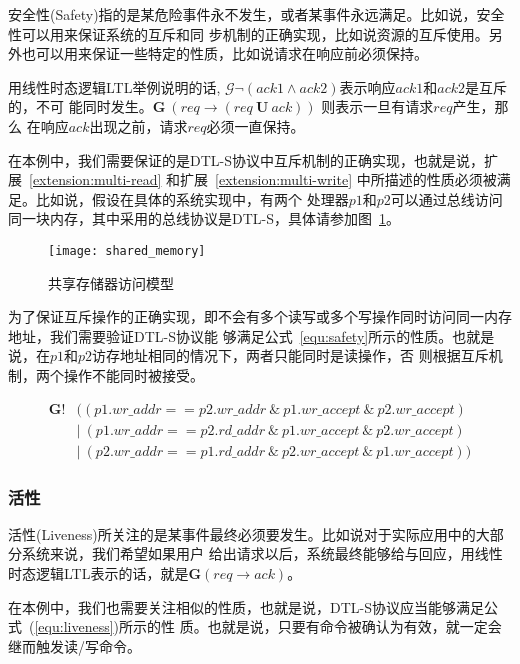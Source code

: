 安全性(Safety)指的是某危险事件永不发生，或者某事件永远满足。比如说，安全性可以用来保证系统的互斥和同
步机制的正确实现，比如说资源的互斥使用。另外也可以用来保证一些特定的性质，比如说请求在响应前必须保持。

用线性时态逻辑LTL举例说明的话, $\mathcal{G} \neg(ack1 \wedge ack2)$表示响应$ack1$和$ack2$是互斥的，不可
能同时发生。$\mathbf{G}\ (req \rightarrow ( req\ \mathbf{U}\ ack))$ 则表示一旦有请求$req$产生，那么
在响应$ack$出现之前，请求$req$必须一直保持。

在本例中，我们需要保证的是DTL-S协议中互斥机制的正确实现，也就是说，扩展~\ref{extension:multi-read}
和扩展~\ref{extension:multi-write} 中所描述的性质必须被满足。比如说，假设在具体的系统实现中，有两个
处理器$p1$和$p2$可以通过总线访问同一块内存，其中采用的总线协议是DTL-S，具体请参加图~\ref{fig:shared_memory}。

\begin{figure}[hl]
\centering
\texttt{[image: shared\_memory]}
\caption{共享存储器访问模型}
\label{fig:shared_memory}
\end{figure} 

为了保证互斥操作的正确实现，即不会有多个读写或多个写操作同时访问同一内存地址，我们需要验证DTL-S协议能
够满足公式~\eqref{equ:safety}所示的性质。也就是说，在$p1$和$p2$访存地址相同的情况下，两者只能同时是读操作，否
则根据互斥机制，两个操作不能同时被接受。

\begin{equation} \label{equ:safety}
\begin{split}
\mathbf{G}!&((p1.wr\_addr == p2.wr\_addr\ \&\ p1.wr\_accept\ \&\ p2.wr\_accept)\\
&|\ (p1.wr\_addr == p2.rd\_addr\ \& \ p1.wr\_accept\ \&\ p2.wr\_accept)\\
&|\ (p2.wr\_addr == p1.rd\_addr\ \& \ p2.wr\_accept\ \&\ p1.wr\_accept))
\end{split}
\end{equation}

\subsubsection{活性}
\label{sec:liveness}

活性(Liveness)所关注的是某事件最终必须要发生。比如说对于实际应用中的大部分系统来说，我们希望如果用户
给出请求以后，系统最终能够给与回应，用线性时态逻辑LTL表示的话，就是$\mathbf{G}(req \rightarrow ack)$。

在本例中，我们也需要关注相似的性质，也就是说，DTL-S协议应当能够满足公式~(\ref{equ:liveness})所示的性
质。也就是说，只要有命令被确认为有效，就一定会继而触发读/写命令。


